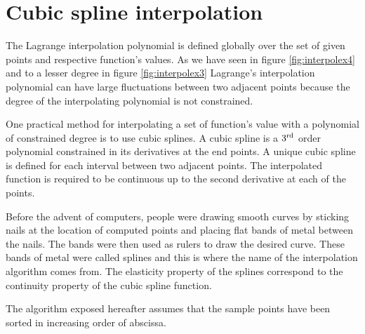 \documentclass[twoside]{book}
\begin{document}
\section{Cubic spline interpolation}
The Lagrange interpolation polynomial is defined globally over the
set of given points and respective function's values. As we have
seen in figure \ref{fig:interpolex4} and to a lesser degree in
figure \ref{fig:interpolex3} Lagrange's interpolation polynomial
can have large fluctuations between two adjacent points because
the degree of the interpolating polynomial is not constrained.

One practical method for interpolating a set of function's value
with a polynomial of constrained degree is to use cubic splines. A
cubic spline is a $3^{\mathop{\rm rd}}$ order polynomial
constrained in its derivatives at the end points. A unique cubic
spline is defined for each interval between two adjacent points.
The interpolated function is required to be continuous up to the
second derivative at each of the points.

Before the advent of computers, people were drawing smooth curves
by sticking nails at the location of computed points and placing
flat bands of metal between the nails. The bands were then used as
rulers to draw the desired curve. These bands of metal were called
splines and this is where the name of the interpolation algorithm
comes from. The elasticity property of the splines correspond to
the continuity property of the cubic spline function.

The algorithm exposed hereafter assumes that the sample points
have been sorted in increasing order of abscissa.
\end{document}
